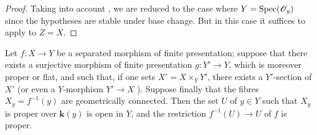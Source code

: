 \begin{proof}
Taking into account , we are reduced to the case where $Y=\operatorname{Spec}(\mathscr{O}_y)$ since the hypotheses are stable under base change.
But in this case it suffices to apply  to $Z=X$.
\end{proof}

\begin{corollary}[15.7.11]
\label{IV.15.7.11}
Let $f:X\to Y$ be a separated morphism of finite presentation; suppose that there exists a surjective morphism of finite presentation $g:Y'\to Y$, which is moreover proper \textup{or} flat, and such that, if one sets $X'=X\times_Y Y'$, there exists a $Y'$-section of $X'$ (or even a $Y$-morphism $Y'\to X$ ).
Suppose finally that the fibres $X_y=f^{-1}(y)$ are geometrically connected.
Then the set $U$ of $y\in Y$ such that $X_y$ is proper over $\boldsymbol{k}(y)$ is open in $Y$, and the restriction $f^{-1}(U)\to U$ of $f$ is proper.
\end{corollary}

